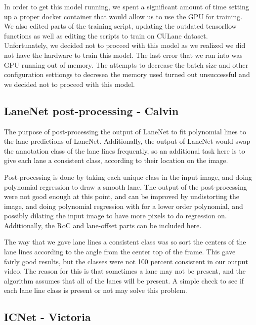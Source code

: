 \documentclass[twoside,twocolumn]{article}
\begin{document}
\par In order to get this model running, we spent a significant amount of time setting up a proper docker container that would allow us to use the GPU for training. We also edited parts of the training script, updating the outdated tensorflow functions as well as editing the scripts to train on CULane dataset. Unfortunately, we decided not to proceed with this model as we realized we did not have the hardware to train this model. The last error that we ran into was GPU running out of memory. The attempts to decrease the batch size and other configuration settiongs to decresea the memory used turned out unsuccessful and we decided not to proceed with this model.


\subsection{LaneNet post-processing - Calvin}
\par The purpose of post-processing the output of LaneNet to fit polynomial lines to the lane predictions of LaneNet. Additionally, the output of LaneNet would swap the annotation class of the lane lines frequently, so an additional task here is to give each lane a consistent class, according to their location on the image.
\par Post-processing is done by taking each unique class in the input image, and doing polynomial regression to draw a smooth lane. The output of the post-processing were not good enough at this point, and can be improved by undistorting the image, and doing polynomial regression with for a lower order polynomial, and possibly dilating the input image to have more pixels to do regression on. Additionally, the RoC and lane-offset parts can be included here.
\par The way that we gave lane lines a consistent class was so sort the centers of the lane lines according to the angle from the center top of the frame. This gave fairly good results, but the classes were not 100 percent consistent in our output video. The reason for this is that sometimes a lane may not be present, and the algorithm assumes that all of the lanes will be present. A simple check to see if each lane line class is present or not may solve this problem.



\subsection{ICNet - Victoria}
\end{document}
